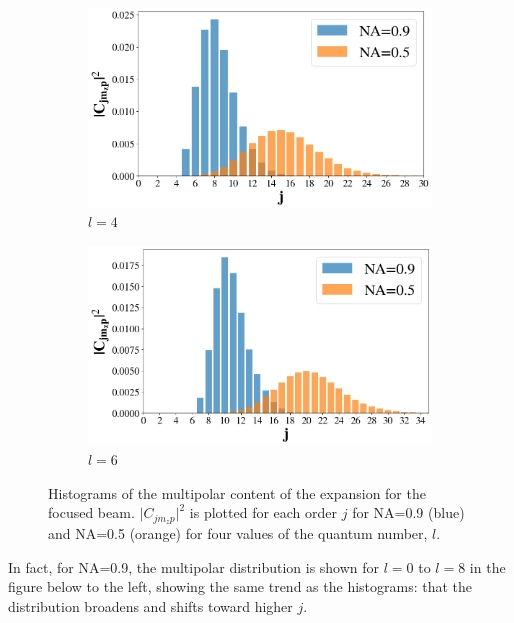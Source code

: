 \begin{figure}
    \par

    \begin{subfigure}[b]{0.49\textwidth}
        \includegraphics[width=\textwidth]{Figures/contentl4.png}
        \caption{\( l=4 \)}
        \label{fig:cc}
    \end{subfigure}
    \begin{subfigure}[b]{0.49\textwidth}
        \includegraphics[width=\textwidth]{Figures/contentl6.png}
        \caption{\( l=6 \)}
        \label{fig:dd}
    \end{subfigure}

    \caption{Histograms of the multipolar content of the expansion for the focused beam. \( \lvert C_{jm_z p} \rvert^2 \) is plotted for each order \( j \) for NA=0.9 (blue) and NA=0.5 (orange) for four values of the quantum number, \( l \).}
    \label{fig:mcontent}
\end{figure}

In fact, for NA=0.9, the multipolar distribution is shown for \( l=0 \) to \( l=8 \) in the figure below to the left, showing the same trend as the histograms: that the distribution broadens and shifts toward higher \( j \).

